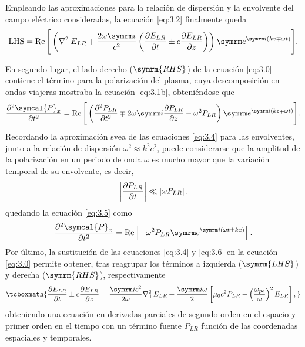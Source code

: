 Empleando las aproximaciones para la relación de dispersión y la envolvente del campo eléctrico consideradas, la ecuación \eqref{eq:3.2} finalmente queda
\begin{equation}\label{eq:3.4}
  \mathrm{LHS} =
  \RE \Bigg[\left(\laplacian_{\perp}E_{LR} + \frac{2 \omega \iu }{c^{2}} \left(\pdv{E_{LR}}{t} \pm c \pdv{E_{LR}}{z}\right)\right)\eu^{\iu (kz \mp \omega t)}\Bigg].
\end{equation}

En segundo lugar, el lado derecho ($\symrm{RHS}$) de la ecuación \eqref{eq:3.0} contiene el término para la polarización del plasma, cuya descomposición en ondas viajeras mostraba la ecuación \eqref{eq:3.1b}, obteniéndose que
\begin{equation}\label{eq:3.5}
  \pdvN{\symcal{P}_{x}}{t}{2} = 
  \RE \Bigg[\left(\pdvN{P_{LR}}{t}{2} \mp 2 \omega \iu \pdv{P_{LR}}{z} - \omega^{2}P_{LR}\right)\eu^{\iu (kz \mp \omega t)}\Bigg].
\end{equation}
Recordando la aproximación \acrshort{svea} de las ecuaciones \eqref{eq:3.4} para las envolventes, junto a la relación de dispersión $\omega^{2} \approx k^{2}c^{2}$, puede considerarse que la amplitud de la polarización en un periodo de onda $\omega$ es mucho mayor que la variación temporal de su envolvente, es decir,
\begin{equation}
  \left|\frac{\partial P_{LR}}{\partial t}\right| \ll \left|\omega P_{LR}\right|,
\end{equation}
quedando la ecuación \eqref{eq:3.5} como
\begin{equation}\label{eq:3.6}
  \pdvN{\symcal{P}_{x}}{t}{2} = \RE \left[- \omega^{2}P_{LR}\eu^{\iu (\omega t \pm kz)}\right].
\end{equation}
Por último, la sustitución de las ecuaciones \eqref{eq:3.4} y \eqref{eq:3.6} en la ecuación \eqref{eq:3.0} permite obtener, tras reagrupar los términos a izquierda ($\symrm{LHS}$) y derecha ($\symrm{RHS}$), respectivamente
\begin{equation}\label{eq:3.7}
  \tcboxmath{\pdv{E_{LR}}{t} \pm c \pdv{E_{LR}}{z} = \frac{\iu c^{2}}{2 \omega}\laplacian_{\perp}E_{LR} + \frac{\iu \omega}{2} \left[\mu_{0}c^{2}P_{LR} - \left(\frac{\omega_{pe}}{\omega}\right)^{2}E_{LR}\right],}
\end{equation}
obteniendo una ecuación en derivadas parciales de segundo orden en el espacio y primer orden en el tiempo con un término fuente $P_{LR}$ función de las coordenadas espaciales y temporales. 

